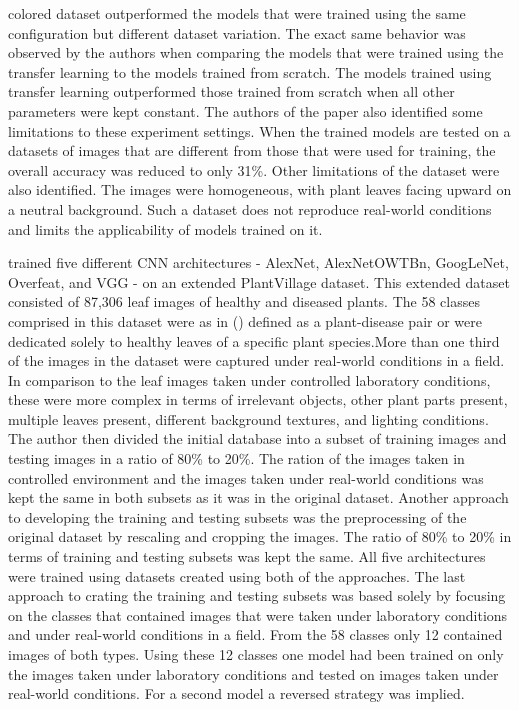 \documentclass{BachelorBUI}
\begin{document}
colored dataset outperformed the models that were trained using the same configuration but different dataset variation. The exact same behavior was observed by the authors when comparing the models that were trained using the transfer learning to the models trained from scratch. The models trained using transfer learning outperformed those trained from scratch when all other parameters were kept constant. The authors of the paper also identified some limitations to these experiment settings. When the trained models are tested on a datasets of images that are different from those that were used for training, the overall accuracy was reduced to only 31\%. Other limitations of the dataset were also identified. The images were homogeneous, with plant leaves facing upward on a neutral background. Such a dataset does not reproduce real-world conditions and limits the applicability of models trained on it.

\textcite{Ferentinos:2018} trained five different CNN architectures - AlexNet, AlexNetOWTBn, GoogLeNet, Overfeat, and VGG - on an extended PlantVillage dataset. This extended dataset consisted of 87,306 leaf images of healthy and diseased plants. The 58 classes comprised in this dataset were as in (\cite{Mohanty:2016}) defined as a plant-disease pair or were dedicated solely to healthy leaves of a specific plant species.More than one third of the images in the dataset were captured under real-world conditions in a field. In comparison to the leaf images taken under controlled laboratory conditions, these were more complex in terms of irrelevant objects, other plant parts present, multiple leaves present, different background textures, and lighting conditions. The author then divided the initial database into a subset of training images and testing images in a ratio of 80\% to 20\%. The ration of the images taken in controlled environment and the images taken under real-world conditions was kept the same in both subsets as it was in the original dataset. Another approach to developing the training and testing subsets was the preprocessing of the original dataset by rescaling and cropping the images. The ratio of 80\% to 20\% in terms of training and testing subsets was kept the same. All five architectures were trained using datasets created using both of the approaches. The last approach to crating the training and testing subsets was based solely by focusing on the classes that contained images that were taken under laboratory conditions and  under real-world conditions in a field. From the 58 classes only 12 contained images of both types. Using these 12 classes one model had been trained on only the images taken under laboratory conditions and tested on images taken under real-world conditions. For a second model a reversed strategy was implied. 
\end{document}
